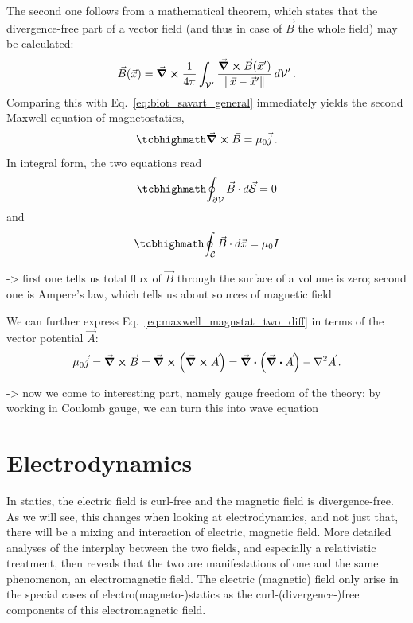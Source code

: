 \documentclass[../class_mech_main.tex]{subfiles}
\begin{document}
The second one follows from a mathematical theorem, which states that the divergence-free part of a vector field (and thus in case of $\vec{B}$ the whole field) may be calculated:
\begin{equation*}
    \vec{B}(\vec{x}) = \curl \frac{1}{4 \pi} \int_{\mathcal{V}'} \frac{\curl \vec{B}(\vec{x}')}{\norm{\vec{x} - \vec{x}'}} \, d\mathcal{V}'
    \, .
\end{equation*}
Comparing this with Eq.~\eqref{eq:biot_savart_general} immediately yields the second Maxwell equation of magnetostatics,
\begin{equation}\label{eq:maxwell_magnstat_two_diff}
    \eqbox{
        \curl \vec{B} = \mu_0 \vec{j}
    } \, .
\end{equation}
In integral form, the two equations read
\begin{equation}\label{eq:maxwell_magnstat_one_int}
    \eqbox{
        \oint_{\partial \mathcal{V}} \vec{B} \cdot d\vec{\mathcal{S}} = 0
    }
\end{equation}
and
\begin{equation}\label{eq:maxwell_magnstat_two_int}
    \eqbox{
        \oint_{\mathcal{C}} \vec{B} \cdot d\vec{x} = \mu_0 I
    }
\end{equation}

-> first one tells us total flux of $\vec{B}$ through the surface of a volume is zero; second one is Ampere's law, which tells us about sources of magnetic field


We can further express Eq.~\eqref{eq:maxwell_magnstat_two_diff} in terms of the vector potential $\vec{A}$:
\begin{equation}
    \mu_0 \vec{j} = \curl \vec{B} = \curl \qty(\curl \vec{A}) = \div \qty(\div \vec{A}) - \laplacian \vec{A}
    \, .
\end{equation}

-> now we come to interesting part, namely gauge freedom of the theory; by working in Coulomb gauge, we can turn this into wave equation



    \section{Electrodynamics}
In statics, the electric field is curl-free and the magnetic field is divergence-free. As we will see, this changes when looking at electrodynamics, and not just that, there will be a mixing and interaction of electric, magnetic field. More detailed analyses of the interplay between the two fields, and especially a relativistic treatment, then reveals that the two are manifestations of one and the same phenomenon, an electromagnetic field. The electric (magnetic) field only arise in the special cases of electro(magneto-)statics as the curl-(divergence-)free components of this electromagnetic field.
\end{document}
